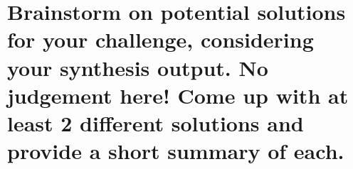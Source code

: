 \section{Brainstorm on potential solutions for your challenge, considering your 
synthesis output. No judgement here! Come up with at least 2 different solutions 
and provide a short summary of each.}
\label{s_1}
